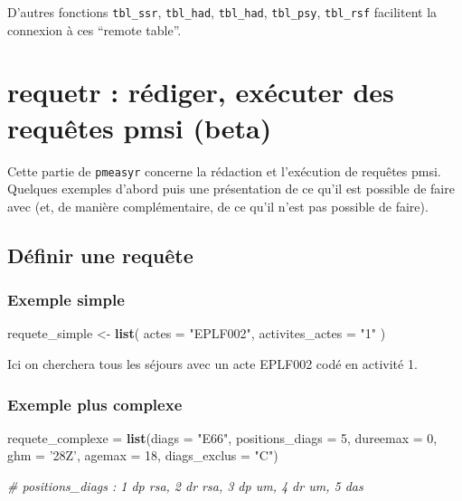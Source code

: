 \documentclass[]{book}
\newenvironment{Shaded}{\begin{snugshade}}{\end{snugshade}}
\newcommand{\KeywordTok}[1]{\textcolor[rgb]{0.13,0.29,0.53}{\textbf{#1}}}
\newcommand{\DataTypeTok}[1]{\textcolor[rgb]{0.13,0.29,0.53}{#1}}
\newcommand{\DecValTok}[1]{\textcolor[rgb]{0.00,0.00,0.81}{#1}}
\newcommand{\StringTok}[1]{\textcolor[rgb]{0.31,0.60,0.02}{#1}}
\newcommand{\CommentTok}[1]{\textcolor[rgb]{0.56,0.35,0.01}{\textit{#1}}}
\newcommand{\NormalTok}[1]{#1}
\theoremstyle{definition}
\theoremstyle{definition}
\theoremstyle{definition}
\theoremstyle{remark}
\begin{document}
D'autres fonctions \texttt{tbl\_ssr}, \texttt{tbl\_had},
\texttt{tbl\_had}, \texttt{tbl\_psy}, \texttt{tbl\_rsf} facilitent la
connexion à ces ``remote table''.

\chapter{requetr : rédiger, exécuter des requêtes pmsi
(beta)}\label{requetr-rediger-executer-des-requetes-pmsi-beta}

Cette partie de \texttt{pmeasyr} concerne la rédaction et l'exécution de
requêtes pmsi. Quelques exemples d'abord puis une présentation de ce
qu'il est possible de faire avec (et, de manière complémentaire, de ce
qu'il n'est pas possible de faire).

\section{Définir une requête}\label{definir-une-requete}

\subsection{Exemple simple}\label{exemple-simple}

\begin{Shaded}
\begin{Highlighting}[]
\NormalTok{requete_simple <-}\StringTok{ }\KeywordTok{list}\NormalTok{(}
  \DataTypeTok{actes =} \StringTok{"EPLF002"}\NormalTok{, }
  \DataTypeTok{activites_actes =} \StringTok{"1"}
\NormalTok{)}
\end{Highlighting}
\end{Shaded}

Ici on cherchera tous les séjours avec un acte EPLF002 codé en activité
1.

\subsection{Exemple plus complexe}\label{exemple-plus-complexe}

\begin{Shaded}
\begin{Highlighting}[]
\NormalTok{requete_complexe =}\StringTok{ }\KeywordTok{list}\NormalTok{(}\DataTypeTok{diags =} \StringTok{"E66"}\NormalTok{, }
                        \DataTypeTok{positions_diags =} \DecValTok{5}\NormalTok{, }
                        \DataTypeTok{dureemax =} \DecValTok{0}\NormalTok{,}
                        \DataTypeTok{ghm =} \StringTok{'28Z'}\NormalTok{,}
                        \DataTypeTok{agemax =} \DecValTok{18}\NormalTok{,}
                        \DataTypeTok{diags_exclus =} \StringTok{"C"}\NormalTok{)}

\CommentTok{# positions_diags : 1 dp rsa, 2 dr rsa, 3 dp um, 4 dr um, 5 das}
\end{Highlighting}
\end{Shaded}
\end{document}
